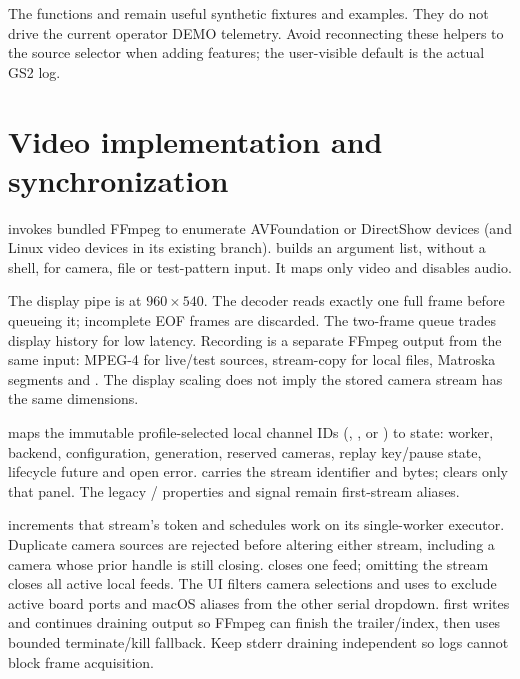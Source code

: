 The functions  and  remain useful
synthetic fixtures and examples. They do not drive the current operator DEMO
telemetry. Avoid reconnecting these helpers to the source selector when adding
features; the user-visible default is the actual GS2 log.

\section{Video implementation and synchronization}\label{sec:media}
 invokes bundled FFmpeg to enumerate AVFoundation or
DirectShow devices (and Linux video devices in its existing branch).
 builds an argument list, without a shell, for camera,
file or test-pattern input. It maps only video and disables audio.

The display pipe is  at \(960\times540\). The decoder reads exactly
one full frame before queueing it; incomplete EOF frames are discarded.
The two-frame queue trades display history for low latency. Recording is a
separate FFmpeg output from the same input: MPEG-4 for live/test sources,
stream-copy for local files, Matroska segments and .
The display scaling does not imply the stored camera stream has the same
dimensions.

 maps the immutable profile-selected local channel IDs (, , or ) to
 state: worker, backend, configuration, generation, reserved
cameras, replay key/pause state, lifecycle future and open error.  carries
the stream identifier and bytes;  clears only that panel.
The legacy / properties and  signal
remain first-stream aliases.

 increments that stream's token and
schedules work on its single-worker executor. Duplicate camera sources are
rejected before altering either stream, including a camera whose prior handle
is still closing.  closes one feed; omitting the stream
closes all active local feeds. The UI filters camera selections and uses 
to exclude active board ports and macOS aliases from the other serial dropdown.  first writes  and continues
draining output so FFmpeg can finish the trailer/index, then uses bounded
terminate/kill fallback. Keep stderr draining independent so logs cannot block
frame acquisition.

